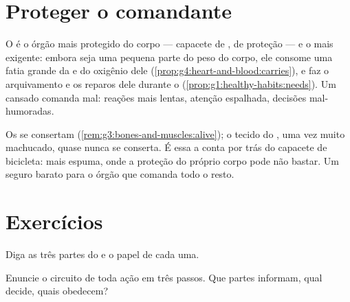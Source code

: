 \section{Proteger o comandante}

\begin{proposition}\label{prop:g5:brain-in-command:protect}
O  é o órgão mais protegido do corpo --- capacete de ,
 de proteção --- e o mais exigente: embora seja uma pequena
parte do peso do corpo, ele consome uma fatia grande da  e do
oxigênio dele (\cref{prop:g4:heart-and-blood:carries}), e faz o
arquivamento e os reparos dele durante o \emph{}
(\cref{prop:g1:healthy-habits:needs}). Um  cansado comanda
mal: reações mais lentas, atenção espalhada, decisões mal-humoradas.
\end{proposition}
\admitted

\begin{example}\label{ex:g5:brain-in-command:helmet}
Os  se consertam (\cref{rem:g3:bones-and-muscles:alive}); o
tecido do , uma vez muito machucado, quase nunca se conserta.
É essa a conta por trás do capacete de bicicleta:  mais espuma,
onde a proteção do próprio corpo pode não bastar. Um seguro barato
para o órgão que comanda todo o resto.
\end{example}

\section{Exercícios}

\begin{exercise}[$\star$]\label{exo:g5:brain-in-command:1}
Diga as três partes do  e o papel de cada uma.
\end{exercise}

\begin{exercise}[$\star$]\label{exo:g5:brain-in-command:2}
Enuncie o circuito de toda ação em três passos. Que partes informam,
qual decide, quais obedecem?
\end{exercise}

